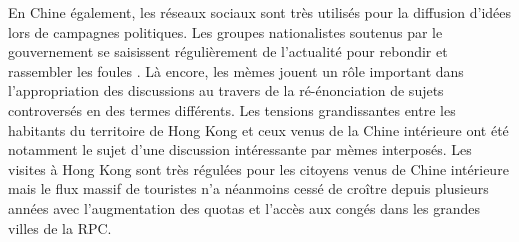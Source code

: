 \begin{description}
En Chine également, les réseaux sociaux sont très utilisés pour la diffusion d{\textquoteright}idées lors de campagnes politiques. Les groupes nationalistes soutenus par le gouvernement se saisissent régulièrement de l{\textquoteright}actualité pour rebondir et rassembler les foules \citep{Wu2007}. Là encore, les mèmes jouent un rôle important dans l{\textquoteright}appropriation des discussions au travers de la ré-énonciation de sujets controversés en des termes différents. Les tensions grandissantes entre les habitants du territoire de Hong Kong et ceux venus de la Chine intérieure ont été notamment le sujet d{\textquoteright}une discussion intéressante par mèmes interposés. Les visites à Hong Kong sont très régulées pour les citoyens venus de Chine intérieure mais le flux massif de touristes n{\textquoteright}a néanmoins cessé de cro\^itre depuis plusieurs années avec l{\textquoteright}augmentation des quotas et l{\textquoteright}accès aux congés dans les grandes villes de la RPC. 


\end{description}
